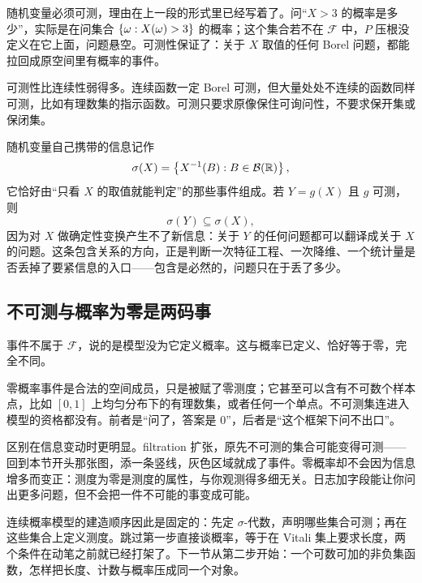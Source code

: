 随机变量必须可测，理由在上一段的形式里已经写着了。问``\(X>3\) 的概率是多少''，实际是在问集合 \(\left\{\omega:X(\omega)>3\right\}\) 的概率；这个集合若不在 \(\mathcal F\) 中，\(P\) 压根没定义在它上面，问题悬空。可测性保证了：关于 \(X\) 取值的任何 Borel 问题，都能拉回成原空间里有概率的事件。

可测性比连续性弱得多。连续函数一定 Borel 可测，但大量处处不连续的函数同样可测，比如有理数集的指示函数。可测只要求原像保住可询问性，不要求保开集或保闭集。

随机变量自己携带的信息记作
\[
\sigma(X)=\left\{X^{-1}(B) : B\in\mathcal B(\mathbb{R})\right\},
\]
它恰好由``只看 \(X\) 的取值就能判定''的那些事件组成。若 \(Y=g(X)\) 且 \(g\) 可测，则
\[
\sigma(Y)\subseteq\sigma(X),
\]
因为对 \(X\) 做确定性变换产生不了新信息：关于 \(Y\) 的任何问题都可以翻译成关于 \(X\) 的问题。这条包含关系的方向，正是判断一次特征工程、一次降维、一个统计量是否丢掉了要紧信息的入口——包含是必然的，问题只在于丢了多少。

\subsection{不可测与概率为零是两码事}

事件不属于 \(\mathcal F\)，说的是模型没为它定义概率。这与概率已定义、恰好等于零，完全不同。

零概率事件是合法的空间成员，只是被赋了零测度；它甚至可以含有不可数个样本点，比如 \([0,1]\) 上均匀分布下的有理数集，或者任何一个单点。不可测集连进入模型的资格都没有。前者是``问了，答案是 0''，后者是``这个框架下问不出口''。

区别在信息变动时更明显。filtration 扩张，原先不可测的集合可能变得可测——回到本节开头那张图，添一条竖线，灰色区域就成了事件。零概率却不会因为信息增多而变正：测度为零是测度的属性，与你观测得多细无关。日志加字段能让你问出更多问题，但不会把一件不可能的事变成可能。

连续概率模型的建造顺序因此是固定的：先定 \(\sigma\)-代数，声明哪些集合可测；再在这些集合上定义测度。跳过第一步直接谈概率，等于在 Vitali 集上要求长度，两个条件在动笔之前就已经打架了。下一节从第二步开始：一个可数可加的非负集函数，怎样把长度、计数与概率压成同一个对象。
